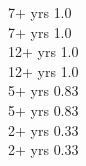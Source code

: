 
 {7+ yrs} {1.0} \\[-8pt]

 {7+ yrs} {1.0} \\[-8pt]

 {12+ yrs} {1.0} \\[-8pt]

 {12+ yrs} {1.0} \\[-8pt]

 {5+ yrs} {0.83} \\[-8pt]

 {5+ yrs} {0.83} \\[-8pt]

 {2+ yrs} {0.33} \\[-8pt]

 {2+ yrs} {0.33} \\[-8pt]

